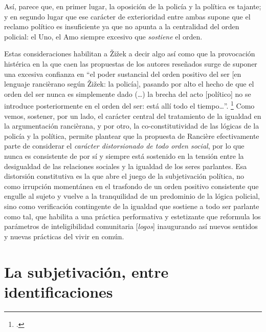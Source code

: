 Así, parece que, en primer lugar, la oposición de la policía y la política es tajante; y en segundo lugar que ese carácter de exterioridad entre ambas supone que el reclamo político es insuficiente ya que no apunta a la centralidad del orden policial: el Uno, el Amo siempre excesivo que \emph{sostiene} el orden.

Estas consideraciones habilitan a Žižek a decir algo así como que la provocación histérica en la que caen las propuestas de los autores reseñados surge de suponer una excesiva confianza en \enquote{el poder sustancial del orden positivo del ser {[}en lenguaje rancièrano según Žižek: la policía{]}, pasando por alto el hecho de que el orden del ser nunca es simplemente dado (\ldots)  la brecha del acto {[}político{]} no se introduce posteriormente en el orden del ser: está allí todo el tiempo\ldots}. \footcite[][258]{@7063-ZIZEK2005} Como vemos, sostener, por un lado, el carácter central del tratamiento de la igualdad en la argumentación rancièrana, y por otro, la co-constitutividad de las lógicas de la policía y la política, permite plantear que la propuesta de Rancière efectivamente parte de considerar el \emph{carácter distorsionado de todo orden social}, por lo que nunca es consistente de por sí y siempre está sostenido en la tensión entre la desigualdad de las relaciones sociales y la igualdad de los seres parlantes. Esa distorsión constitutiva es la que abre el juego de la subjetivación política, no como irrupción momentánea en el trasfondo de un orden positivo consistente que engulle al sujeto y vuelve a la tranquilidad de un predominio de la lógica policial, sino como verificación contingente de la igualdad que sostiene a todo ser parlante como tal, que habilita a una práctica performativa y estetizante que reformula los parámetros de inteligibilidad comunitaria {[}\emph{logos}{]} inaugurando así nuevos sentidos y nuevas prácticas del vivir en común.

\section{La subjetivación, entre identificaciones}


